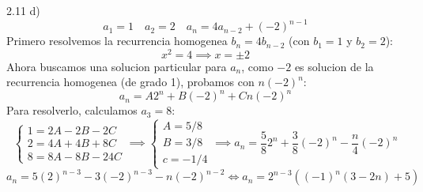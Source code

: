 \documentclass{article}
\begin{document}
2.11 d)
\[
a_1 = 1 \quad a_2 = 2 \quad a_n = 4a_{n-2} + (-2)^{n-1}
\]
Primero resolvemos la recurrencia homogenea $b_n = 4b_{n-2}$ (con $b_1 = 1$ y $b_2 = 2$):
\[
x^2 = 4 \implies x = \pm 2
\]
Ahora buscamos una solucion particular para $a_n$, como $-2$ es solucion de la recurrencia homogenea (de grado 1),
probamos con $n(-2)^n$:
\[
a_n = A2^{n} + B(-2)^n + Cn(-2)^n
\]
Para resolverlo, calculamos $a_3 = 8$:
\[
\begin{cases}
1 = 2A -2B -2C \\
2 = 4A + 4B +8C \\
8 = 8A - 8B -24C
\end{cases}
\implies
\begin{cases}
A = 5/8 \\
B = 3/8 \\
c = -1/4
\end{cases}
\implies
a_n = \frac{5}{8}2^n + \frac{3}{8}(-2)^n -\frac{n}{4}(-2)^n
\]
\[
a_n = 5 (2)^{n-3} - 3(-2)^{n-3} - n (-2)^{n-2}
\iff
a_n = 2^{n-3} \left( (-1)^{n}(3 - 2n) + 5 \right)
\]
\end{document}
